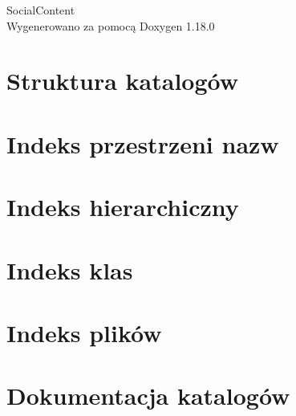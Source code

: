 \documentclass[twoside]{book}
\newcommand{\+}{\discretionary{\mbox{\scriptsize$\hookleftarrow$}}{}{}}
\newcommand{\clearemptydoublepage}{%
    \newpage{\pagestyle{empty}\cleardoublepage}%
  }
\begin{document}
  \raggedbottom
    \hypersetup{pageanchor=false,
                bookmarksnumbered=true,
                pdfencoding=unicode
               }
  \begin{titlepage}
  \vspace*{7cm}
  \begin{center}%
  {\Large Social\+Content}\\
  \vspace*{1cm}
  {\large Wygenerowano za pomocą Doxygen 1.18.0}\\
  \end{center}
  \end{titlepage}
  \clearemptydoublepage
  \tableofcontents
  \clearemptydoublepage
  \hypersetup{pageanchor=true}
\chapter{Struktura katalogów}

\chapter{Indeks przestrzeni nazw}

\chapter{Indeks hierarchiczny}

\chapter{Indeks klas}

\chapter{Indeks plików}

\chapter{Dokumentacja katalogów}






















\end{document}
